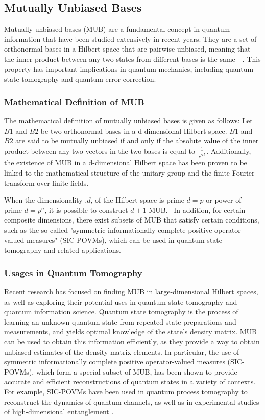 \subsection{Mutually Unbiased Bases}\label{subsec:mutually-unbiased-bases}
Mutually unbiased bases (MUB) are a fundamental concept in quantum information that have been studied extensively in recent years.
They are a set of orthonormal bases in a Hilbert space that are pairwise unbiased, meaning that the inner product between
any two states from different bases is the same~\cite{wootters1989optimal}~\cite{durt2010mutually}.
This property has important implications in quantum mechanics,
including quantum state tomography and quantum error correction.

\subsubsection{Mathematical Definition of MUB}\label{subsubsec:mathematical-definition-of-mub}
The mathematical definition of mutually unbiased bases is given as follows:
Let $B1$ and $B2$ be two orthonormal bases in a d-dimensional Hilbert space.
$B1$ and $B2$ are said to be mutually unbiased
if and only if the absolute value of the inner product between any two vectors in the two bases is equal to $\frac{1}{\sqrt {d}}$.
Additionally, the existence of MUB in a d-dimensional Hilbert space has been proven to be linked to the
mathematical structure of the unitary group and the finite Fourier transform over finite fields.

When the dimensionality ,$d$, of the Hilbert space is prime $d=p$ or power of prime $d=p^n$, it is possible to construct $d+1$ MUB.~\cite{durt2010mutually}
In addition, for certain composite dimensions, there exist subsets of MUB that satisfy certain conditions,
such as the so-called "symmetric informationally complete positive operator-valued measures" (SIC-POVMs),
which can be used in quantum state tomography and related applications.


\subsubsection{Usages in Quantum Tomography}
Recent research has focused on finding MUB in large-dimensional Hilbert spaces, as well as exploring their potential
uses in quantum state tomography and quantum information science.
Quantum state tomography is the process of learning an unknown quantum state from repeated state preparations and measurements,
and yields optimal knowledge of the state's density matrix. MUB can be used to obtain this information efficiently,
as they provide a way to obtain unbiased estimates of the density matrix elements. In particular, the use of symmetric
informationally complete positive operator-valued measures (SIC-POVMs), which form a special subset of MUB,
has been shown to provide accurate and efficient reconstructions of quantum states in a variety of contexts.
For example, SIC-POVMs have been used in quantum process tomography to reconstruct the dynamics of quantum channels,
as well as in experimental studies of high-dimensional entanglement \cite{ZhuHayashi2020}\cite{GrossEtAl2010}.


